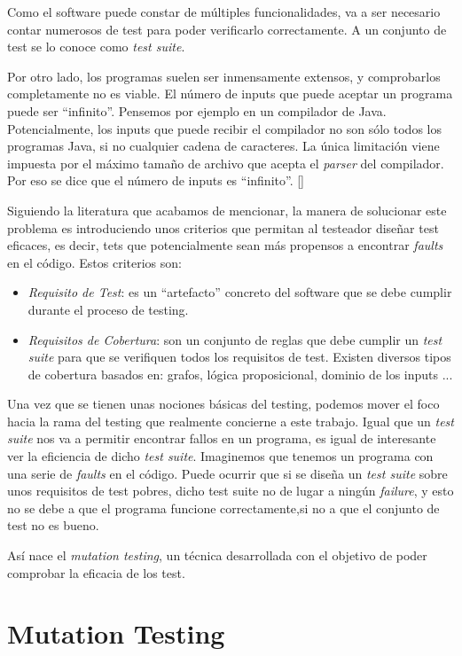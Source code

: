Como el software puede constar de múltiples funcionalidades, va a ser necesario contar numerosos de test para poder verificarlo correctamente. A un conjunto de test se lo conoce como \textit{test suite}. 

Por otro lado, los programas suelen ser inmensamente extensos, y comprobarlos completamente no es viable. El número de inputs  que puede aceptar un programa puede ser ``infinito''. Pensemos por ejemplo en un compilador de Java. Potencialmente, los inputs que puede recibir el compilador no son sólo todos los programas Java, si no cualquier cadena de caracteres. La única limitación viene impuesta por el máximo tamaño de archivo que acepta el \textit{parser} del compilador. Por eso se dice que el número de inputs es ``infinito''. [\cite{ammann2016introduction}]

Siguiendo la literatura que acabamos de mencionar, la manera de solucionar este problema es introduciendo unos criterios que permitan al testeador diseñar test eficaces, es decir, tets que potencialmente sean más propensos a encontrar \textit{faults} en el código. Estos criterios son:
\begin{itemize}
\item \emph{Requisito de Test}: es un ``artefacto'' concreto del software que se debe cumplir durante el proceso de testing.
\item \emph{Requisitos de Cobertura}: son un conjunto de reglas que debe cumplir un \textit{test suite} para que se verifiquen todos los requisitos de test. Existen diversos tipos de cobertura basados en: grafos, lógica proposicional, dominio de los inputs ...
\end{itemize}

Una vez que se tienen unas nociones básicas del testing, podemos mover el foco hacia la rama del testing que realmente concierne a este trabajo. Igual que un \textit{test suite} nos va a permitir
encontrar fallos en un programa, es igual de interesante ver la eficiencia de dicho \textit{test suite}. Imaginemos que tenemos un programa con una serie de \emph{faults} en el código. Puede ocurrir que si se diseña un \textit{test suite} sobre unos requisitos de test pobres, dicho test suite no de lugar a ningún \emph{failure}, y esto no se debe a que el programa funcione correctamente,si no a que el conjunto de test no es bueno.

Así nace el \textit{mutation testing}, un técnica desarrollada con el objetivo de poder comprobar la eficacia de los test.

\section{Mutation Testing}

